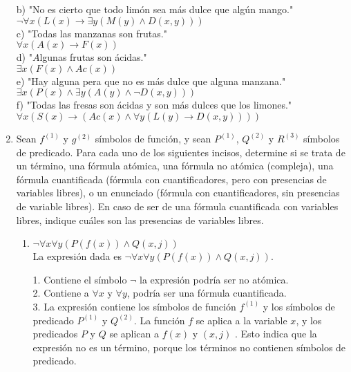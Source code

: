 \documentclass[a4paper,10pt]{article}
\begin{document}
\begin{enumerate}
b) "No es cierto que todo lim\'on sea m\'as dulce que alg\'un mango."\\
$\neg \forall x (L(x) \rightarrow \exists y (M(y) \land D(x, y)))$\\

c) "Todas las manzanas son frutas."\\
$\forall x (A(x) \rightarrow F(x))$\\

d) "$A$lgunas frutas son  \'acidas."\\
$\exists x (F(x) \land Ac(x))$\\

e) "Hay alguna pera que no es m\'as dulce que alguna manzana."\\
$\exists x (P(x) \land \exists y (A(y) \land \neg D(x, y)))$\\

f) "Todas las fresas son \'acidas y son m\'as dulces que los limones."\\
$\forall x (S(x) \rightarrow (Ac(x) \land \forall y (L(y) \rightarrow D(x, y))))$\\

   
   \item {} Sean $f^{(1)}$ y $g^{(2)}$ s\'imbolos de funci\'on, y sean $P^{(1)}$, $Q^{(2)}$ y $R^{(3)}$ s\'imbolos de predicado.
	Para cada uno de los siguientes incisos, determine si se trata de un t\'ermino, una f\'ormula at\'omica, una f\'ormula no at\'omica (compleja), una f\'ormula cuantificada (f\'ormula con cuantificadores, pero con presencias de variables libres), o un enunciado (f\'ormula con cuantificadores, sin presencias de variable libres). 
	En caso de ser de una f\'ormula cuantificada con variables libres, indique cu\'ales son las presencias de variables libres.

  \begin{enumerate}
  	\item $\neg\forall x\forall y(P(f(x)) \land Q(x,j))$\\
   
La expresión dada es \( \neg \forall x \forall y(P(f(x)) \wedge Q(x, j)) \).

1. Contiene el símbolo \( \neg \) la expresión podría ser no atómica.\\

2. Contiene a \( \forall x \) y \( \forall y \), podría ser una fórmula cuantificada.\\

3. La expresión contiene los símbolos de función \( f^{(1)} \) y los símbolos de predicado \( P^{(1)} \) y \( Q^{(2)} \). La función \( f \) se aplica a la variable \( x \), y los predicados \( P \) y \( Q \) se aplican a \( f(x) \) y \( (x, j ) \) . Esto indica que la expresión no es un término, porque los términos no contienen símbolos de predicado.\\


\end{enumerate}
\end{enumerate}
\end{document}
